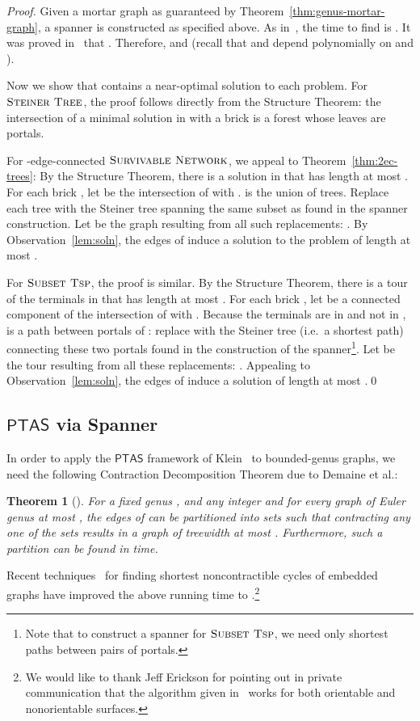 \documentclass{article}
\newtheorem{theorem}{Theorem}
\newcommand{\CompClass}[1]{\ensuremath{\mathsf{#1}}\xspace}
\newcommand{\PTAS}{\CompClass{PTAS}}
\newcommand{\myproblemname}[1]{\ensuremath{\mbox{\sc #1}}\xspace}
\newcommand{\steiner}{\myproblemname{Steiner Tree}}
\newcommand{\subtsp}{\myproblemname{Subset Tsp}}
\newcommand{\survive}{\myproblemname{Survivable Network}}
\begin{document}
\begin{proof}
  Given a mortar graph  as guaranteed by
  Theorem~\ref{thm:genus-mortar-graph}, a spanner is constructed
  as specified above.  As in~\cite{BorradaileKM09}, the time to find
   is .  It was proved in~\cite{BorradaileKM09}
  that .
  Therefore,  and
   (recall that  and
   depend polynomially on  and ). 
  
  Now we show that  contains a near-optimal solution to each
  problem.
  For \steiner, the proof follows directly from the Structure Theorem:
  the intersection of a minimal solution in  with a
  brick  is a forest whose leaves are portals.

  For -edge-connected \survive, we appeal to
  Theorem~\ref{thm:2ec-trees}: By the Structure Theorem, there
  is a solution  in  that has length at most
  .  For each brick , let  be the
  intersection of  with .  
   is the union of trees.
Replace each tree with the Steiner
  tree spanning the same subset as found in the spanner construction.
  Let  be the graph resulting from all such replacements:
  .  By
  Observation~\ref{lem:soln}, the edges of  induce
  a solution to the problem of length at most .

  For \subtsp, the proof is similar.  By the Structure Theorem, there
  is a tour  of the terminals  in  that has length at
  most .  For each brick , let  be a
  connected component of the intersection of  with .  Because
  the terminals are in  and not in ,  is a path between
  portals of : replace  with the Steiner tree (i.e.\ a shortest
  path) connecting these two portals found in the construction of the
  spanner\footnote{Note that to construct a spanner for \subtsp, we
    need only shortest paths between pairs of portals.}.  Let
   be the tour resulting from all these replacements: .  Appealing to
  Observation~\ref{lem:soln}, the edges of  induce
  a solution of length at most .\qed
\end{proof}

\subsection{\PTAS via Spanner}\label{sect:ptas_spanner}

In order to apply the \PTAS framework of Klein~\cite{Klein08} to
bounded-genus graphs, we need the following Contraction Decomposition
Theorem due to Demaine et al.:

\begin{theorem}[{\cite[Theorem~1.1]{DemaineHM07}}] \label{thm:genus-baker}
  For a fixed genus , and any integer  and for every
  graph  of Euler genus at most , the edges of  can be
  partitioned into  sets such that contracting any one of the sets
  results in a graph of treewidth at most .  Furthermore,
  such a partition can be found in  time.
\end{theorem}
Recent techniques~\cite{CabelloChambers07} for finding shortest
noncontractible cycles of embedded graphs have improved the above
running time to .\footnote{We would like to thank Jeff
  Erickson for pointing out in private communication that the
  algorithm given in~\cite{CabelloChambers07} works for both
  orientable and nonorientable surfaces.}
\end{document}
